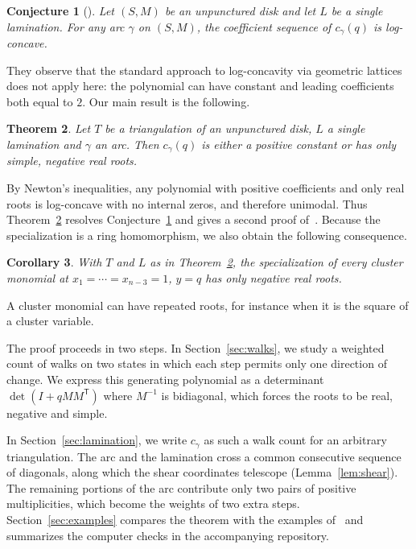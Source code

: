 \documentclass[11pt]{amsart}
\newtheorem{theorem}{Theorem}[section]
\newtheorem{corollary}[theorem]{Corollary}
\newtheorem{conjecture}[theorem]{Conjecture}
\theoremstyle{remark}
\numberwithin{equation}{section}
\begin{document}
\begin{conjecture}[{\cite[Conjecture~1]{KLL}}]\label{conj:KLL}
Let $(S,M)$ be an unpunctured disk and let $L$ be a single lamination. For any
arc $\gamma$ on $(S,M)$, the coefficient sequence of $c_\gamma(q)$ is
log-concave.
\end{conjecture}

They observe that the standard approach to log-concavity via geometric lattices
does not apply here: the polynomial can have constant and leading coefficients
both equal to $2$. Our main result is the following.

\begin{theorem}\label{thm:main}
Let $T$ be a triangulation of an unpunctured disk, $L$ a single lamination and
$\gamma$ an arc. Then $c_\gamma(q)$ is either a positive constant or has only
simple, negative real roots.
\end{theorem}

By Newton's inequalities, any polynomial with positive coefficients and only
real roots is log-concave with no internal zeros, and therefore unimodal. Thus
Theorem~\ref{thm:main} resolves Conjecture~\ref{conj:KLL} and gives a second
proof of~\cite[Theorem~14]{KLL}. Because the specialization is a ring
homomorphism, we also obtain the following consequence.

\begin{corollary}\label{cor:monomials}
With $T$ and $L$ as in Theorem~\ref{thm:main}, the specialization of every
cluster monomial at $x_1=\cdots=x_{n-3}=1$, $y=q$ has only negative real roots.
\end{corollary}

A cluster monomial can have repeated roots, for instance when it is the square
of a cluster variable.

The proof proceeds in two steps. In Section~\ref{sec:walks}, we study a
weighted count of walks on two states in which each step permits only one
direction of change. We express this generating polynomial as a determinant
$\det(I+qMM^{\mathsf T})$ where $M^{-1}$ is bidiagonal, which forces the roots
to be real, negative and simple.

In Section~\ref{sec:lamination}, we write $c_\gamma$ as such a walk count for
an arbitrary triangulation. The arc and the lamination cross a common
consecutive sequence of diagonals, along which the shear coordinates telescope
(Lemma~\ref{lem:shear}). The remaining portions of the arc contribute only two
pairs of positive multiplicities, which become the weights of two extra steps.
Section~\ref{sec:examples} compares the theorem with the examples
of~\cite{KLL} and summarizes the computer checks in the accompanying
repository.
\end{document}
